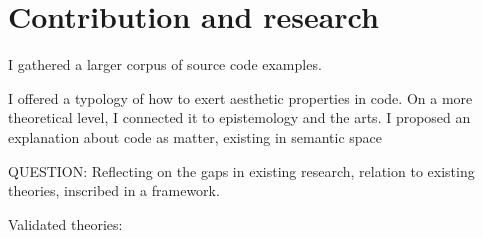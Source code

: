 

\section{Contribution and research}

I gathered a larger corpus of source code examples.

I offered a typology of how to exert aesthetic properties in code.
On a more theoretical level, I connected it to epistemology and the arts.
I proposed an explanation about code as matter, existing in semantic space

QUESTION: Reflecting on the gaps in existing research, relation to existing theories, inscribed in a framework.

Validated theories:

